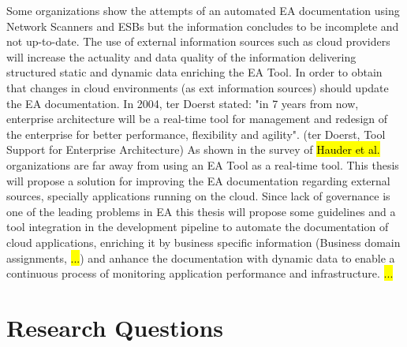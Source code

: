 Some organizations show the attempts of an automated EA documentation using Network Scanners and ESBs but the information concludes to be incomplete and not up-to-date. 
The use of external information sources such as cloud providers will increase the actuality and data quality of the information delivering structured static and dynamic data enriching the EA Tool. In order to obtain that changes in cloud environments (as ext information sources) should update the EA documentation.
In 2004, ter Doerst stated: "in 7 years from now, enterprise architecture will be a real-time tool for management and redesign of the enterprise for better performance, flexibility and agility". (ter Doerst, Tool Support for Enterprise Architecture)
As shown in the survey of \hl{Hauder et al.} organizations are far away from using an EA Tool as a real-time tool. This thesis will propose a solution for improving the EA documentation regarding external sources, specially applications running on the cloud. Since lack of governance is one of the leading problems in EA this thesis will propose some guidelines %
and a tool integration in the development pipeline to automate the documentation of cloud applications, enriching it by business specific information (Business domain assignments, \hl{...}) and anhance the documentation with dynamic data to enable a continuous process of monitoring application performance and infrastructure.
\hl{ ... }

\section{Research Questions}


